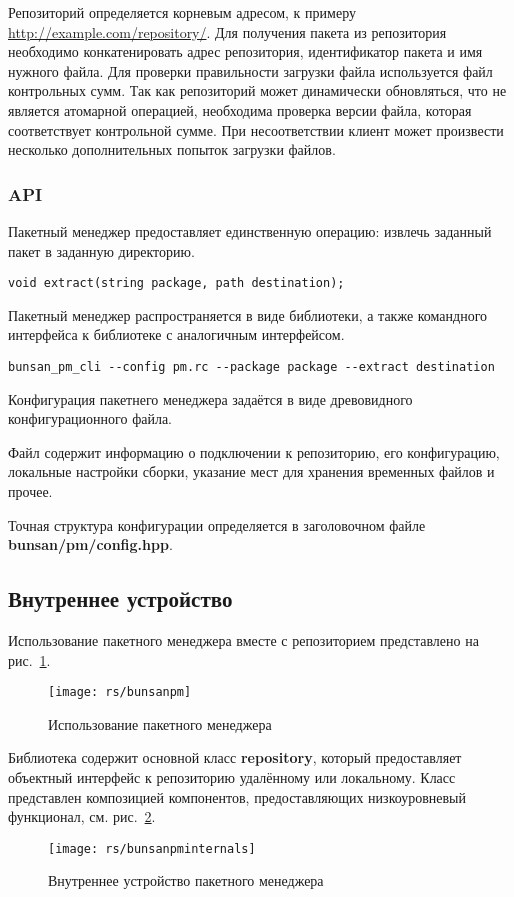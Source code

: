 Репозиторий определяется корневым адресом, к примеру \url{http://example.com/repository/}.
Для получения пакета из репозитория необходимо конкатенировать адрес репозитория,
идентификатор пакета и имя нужного файла. Для проверки правильности загрузки файла
используется файл контрольных сумм. Так как репозиторий может динамически обновляться,
что не является атомарной операцией, необходима проверка версии файла, которая соответствует
контрольной сумме. При несоответствии клиент может произвести несколько дополнительных
попыток загрузки файлов.

\subsubsection{API}
Пакетный менеджер предоставляет единственную операцию:
извлечь заданный пакет в заданную директорию.

\begin{verbatim}
void extract(string package, path destination);
\end{verbatim}

Пакетный менеджер распространяется в виде библиотеки,
а также командного интерфейса к библиотеке с аналогичным интерфейсом.

\begin{verbatim}
bunsan_pm_cli --config pm.rc --package package --extract destination
\end{verbatim}

Конфигурация пакетнего менеджера задаётся в виде древовидного
конфигурационного файла.

Файл содержит информацию о подключении к репозиторию, его конфигурацию,
локальные настройки сборки, указание мест для хранения временных файлов и прочее.

Точная структура конфигурации определяется в заголовочном файле
\textbf{bunsan/pm/config.hpp}.

\subsection{Внутреннее устройство}
Использование пакетного менеджера вместе с репозиторием представлено на рис.~\ref{fig:bunsanpm}.

\begin{figure}
    \texttt{[image: rs/bunsanpm]}
    \caption{Использование пакетного менеджера}
    \label{fig:bunsanpm}
\end{figure}

Библиотека содержит основной класс \textbf{repository}, который предоставляет
объектный интерфейс к репозиторию удалённому или локальному.
Класс представлен композицией компонентов, предоставляющих низкоуровневый функционал,
см. рис.~\ref{fig:bunsanpminternals}.

\begin{figure}
    \texttt{[image: rs/bunsanpminternals]}
    \caption{Внутреннее устройство пакетного менеджера}
    \label{fig:bunsanpminternals}
\end{figure}

